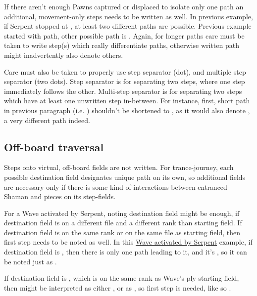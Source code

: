 If there aren't enough Pawns captured or displaced to isolate only one path an
additional, movement-only steps needs to be written as well. In previous example,
if Serpent stopped at , at least two different paths are possible. Previous
example started with  path, other
possible path is . Again, for longer
paths care must be taken to write step(s) which really differentiate paths, otherwise
written path might inadvertently also denote others.

Care must also be taken to properly use step separator  (dot), and multiple
step separator  (two dots). Step separator  is for separating two
steps, where one step immediately follows the other. Multi-step separator 
is for separating two steps which have at least one unwritten step in-between.
For instance, first, short path in previous paragraph (i.e.
) shouldn't be shortened to
, as it would also denote
, a very different path indeed.

\subsection*{Off-board traversal}
\label{sec:Appendix/Notation/Off-board traversal}

Steps onto virtual, off-board fields are not written. For trance-journey, each possible
destination field designates unique path on its own, so additional fields are necessary
only if there is some kind of interactions between entranced Shaman and pieces on its
step-fields.

For a Wave activated by Serpent, noting destination field might be enough, if destination
field is on a different file and a different rank than starting field. If destination field
is on the same rank or on the same file as starting field, then first step needs to be noted
as well. In this \hyperref[fig:scn_tr_43_serpent_activated_wave_ply]{Wave activated by Serpent}
example, if destination field is , then there is only one path leading to it, and
it's , so it can be noted just as
.

If destination field is , which is on the same rank as Wave's ply starting field,
then  might be interpreted as either
, or as\newline
{}, so first step is needed, like so
.

